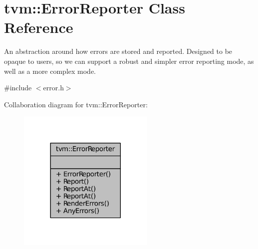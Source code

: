 \hypertarget{classtvm_1_1ErrorReporter}{}\section{tvm\+:\+:Error\+Reporter Class Reference}
\label{classtvm_1_1ErrorReporter}


An abstraction around how errors are stored and reported. Designed to be opaque to users, so we can support a robust and simpler error reporting mode, as well as a more complex mode.  




{\ttfamily \#include $<$error.\+h$>$}



Collaboration diagram for tvm\+:\+:Error\+Reporter\+:
\nopagebreak
\begin{figure}[H]
\begin{center}
\leavevmode
\includegraphics[width=185pt]{classtvm_1_1ErrorReporter__coll__graph}
\end{center}
\end{figure}

